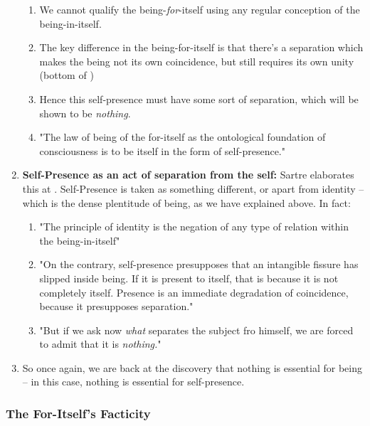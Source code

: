 \begin{enumerate}
\begin{enumerate}
    \item We cannot qualify the being-\emph{for}-itself using any regular conception of the being-in-itself.
    \item The key difference in the being-for-itself is that there's a separation which makes the being not its own coincidence, but still requires its own unity (bottom of \autocite[126]{sartre})
    \item Hence this self-presence must have some sort of separation, which will be shown to be \emph{nothing}.
    \item "The law of being of the for-itself as the ontological foundation of consciousness is to be itself in the form of self-presence." \autocite[126]{sartre}
  \end{enumerate}
  \item \textbf{Self-Presence as an act of separation from the self:} Sartre elaborates this at \autocite[127]{sartre}. Self-Presence is taken as something different, or apart from identity -- which is the dense plentitude of being, as we have explained above. In fact:
  \begin{enumerate}
    \item "The principle of identity is the negation of any type of relation within the being-in-itself"
    \item "On the contrary, self-presence presupposes that an intangible fissure has slipped inside being. If it is present to itself, that is because it is not completely itself. Presence is an immediate degradation of coincidence, because it presupposes separation."
    \item "But if we ask now \emph{what} separates the subject fro himself, we are forced to admit that it is \emph{nothing.}" \autocite[127]{sartre}
  \end{enumerate}
  \item So once again, we are back at the discovery that nothing is essential for being -- in this case, nothing is essential for self-presence.
\end{enumerate}

\subsubsection{The For-Itself's Facticity}

